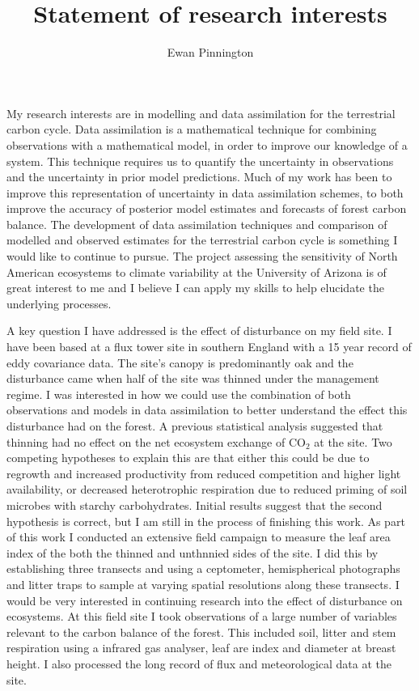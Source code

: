 \documentclass[11pt]{article}
\title{\vspace{-2cm}Statement of research interests}
\author{Ewan Pinnington}
\date{}
\begin{document}
\maketitle
\vspace{-.5cm}
My research interests are in modelling and data assimilation for the terrestrial carbon cycle. Data assimilation is a mathematical technique for combining observations with a mathematical model, in order to improve our knowledge of a system. This technique requires us to quantify the uncertainty in observations and the uncertainty in prior model predictions. Much of my work has been to improve this representation of uncertainty in data assimilation schemes, to both improve the accuracy of posterior model estimates and forecasts of forest carbon balance. The development of data assimilation techniques and comparison of modelled and observed estimates for the terrestrial carbon cycle is something I would like to continue to pursue. The project assessing the sensitivity of North American ecosystems to climate variability at the University of Arizona is of great interest to me and I believe I can apply my skills to help elucidate the underlying processes.

A key question I have addressed is the effect of disturbance on my field site. I have been based at a flux tower site in southern England with a 15 year record of eddy covariance data. The site's canopy is predominantly oak and the disturbance came when half of the site was thinned under the management regime. I was interested in how we could use the combination of both observations and models in data assimilation to better understand the effect this disturbance had on the forest. A previous statistical analysis suggested that thinning had no effect on the net ecosystem exchange of CO\(_{2}\) at the site. Two competing hypotheses to explain this are that either this could be due to regrowth and increased productivity from reduced competition and higher light availability, or decreased heterotrophic respiration due to reduced priming of soil microbes with starchy carbohydrates. Initial results suggest that the second hypothesis is correct, but I am still in the process of finishing this work. As part of this work I conducted an extensive field campaign to measure the leaf area index of the both the thinned and unthnnied sides of the site. I did this by establishing three transects and using a ceptometer, hemispherical photographs and litter traps to sample at varying spatial resolutions along these transects. I would be very interested in continuing research into the effect of disturbance on ecosystems. At this field site I took observations of a large number of variables relevant to the carbon balance of the forest. This included soil, litter and stem respiration using a infrared gas analyser, leaf are index and diameter at breast height. I also processed the long record of flux and meteorological data at the site. 
\end{document}
